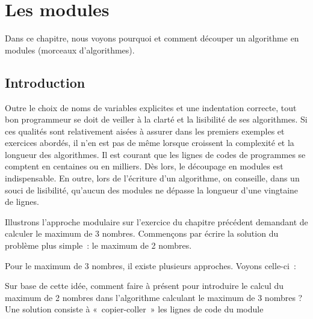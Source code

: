 \chapter{Les modules}

	Dans ce chapitre, nous voyons pourquoi et comment découper un algorithme
	en modules (morceaux d'algorithmes).

\section{Introduction}

	Outre le choix de noms de variables explicites et une indentation
	correcte, tout bon programmeur se doit de veiller à la clarté et la
	lisibilité de ses algorithmes. Si ces qualités sont relativement aisées
	à assurer dans les premiers exemples et exercices abordés, il n’en est
	pas de même lorsque croissent la complexité et la longueur des
	algorithmes. Il est courant que les lignes de codes de programmes se
	comptent en centaines ou en milliers. Dès lors, le découpage en modules
	est indispensable. En outre, lors de l’écriture d’un algorithme, on 
	conseille, dans un souci de lisibilité, qu’aucun des modules
	ne dépasse la longueur d’une vingtaine de lignes.
	
	Illustrons l’approche modulaire sur l’exercice du chapitre précédent
	demandant de calculer le maximum de 3 nombres. Commençons par écrire la
	solution du problème plus simple~: le maximum de 2 nombres.

	
	Pour le maximum de 3 nombres, il existe plusieurs approches. Voyons
	celle-ci~:


	{Sur base de cette idée, comment faire à présent
	pour introduire le calcul du maximum de 2 nombres dans l’algorithme
	calculant le maximum de 3 nombres ? Une solution consiste à
	«~copier-coller~» les lignes de code du module
	}

